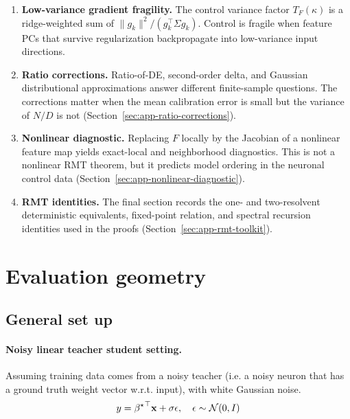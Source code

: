 \begin{enumerate}
\item \textbf{Low-variance gradient fragility.} The control variance factor
$T_F(\kappa)$ is a ridge-weighted sum of
$\|g_k\|^2/(g_k^\top\Sigma g_k)$.  Control is fragile when feature PCs that
survive regularization backpropagate into low-variance input directions.

\item \textbf{Ratio corrections.} Ratio-of-DE, second-order delta, and
Gaussian distributional approximations answer different finite-sample
questions.  The corrections matter when the mean calibration error is small
but the variance of $N/D$ is not (Section~\ref{sec:app-ratio-corrections}).

\item \textbf{Nonlinear diagnostic.} Replacing $F$ locally by the Jacobian of
a nonlinear feature map yields exact-local and neighborhood diagnostics. This
is not a nonlinear RMT theorem, but it predicts model ordering in the neuronal
control data (Section~\ref{sec:app-nonlinear-diagnostic}).

\item \textbf{RMT identities.} The final section records the one- and
two-resolvent deterministic equivalents, fixed-point relation, and spectral
recursion identities used in the proofs
(Section~\ref{sec:app-rmt-toolkit}).
\end{enumerate}
\endgroup



\section{Evaluation geometry}
\label{sec:app-evaluation-geometry}

\subsection{General set up}

\paragraph{Noisy linear teacher student setting.}

Assuming training data comes from a noisy teacher (i.e. a noisy neuron
that has a ground truth weight vector w.r.t. input), with white Gaussian
noise.
\[
y={{\beta^{\star}}}^{\top}\mathbf{x}+\sigma\epsilon,\quad\epsilon\sim\mathcal{N}(0,I)
\]

